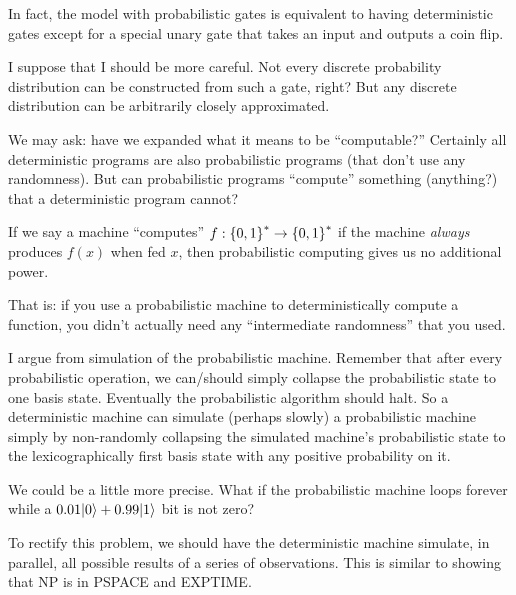 \begin{remark}
  In fact, the model with probabilistic gates is equivalent to having
  deterministic gates except for a special unary gate that takes an
  input and outputs a coin flip.

  I suppose that I should be more careful. Not every discrete
  probability distribution can be constructed from such a gate, right?
  But any discrete distribution can be arbitrarily closely approximated.
\end{remark}

\begin{remark}
  We may ask: have we expanded what it means to be ``computable?''
  Certainly all deterministic programs are also probabilistic programs
  (that don't use any randomness). But can probabilistic programs
  ``compute'' something (anything?) that a deterministic program cannot?

  If we say a machine ``computes'' $f: \left\{ 0, 1 \right\}^* \to \left\{ 0,
  1 \right\}^*$ if the machine \emph{always} produces $f(x)$ when fed $x$, then
  probabilistic computing gives us no additional power.

  That is: if you use a probabilistic machine to deterministically
  compute a function, you didn't actually need any ``intermediate
  randomness'' that you used.

  I argue from simulation of the probabilistic machine. Remember that
  after every probabilistic operation, we can/should simply collapse the
  probabilistic state to one basis state. Eventually the probabilistic
  algorithm should halt. So a deterministic machine can simulate
  (perhaps slowly) a probabilistic machine simply by non-randomly
  collapsing the simulated machine's probabilistic state to the
  lexicographically first basis state with any positive probability on
  it.
\end{remark}

\begin{remark}
  We could be a little more precise. What if the probabilistic machine
  loops forever while a $0.01 |0\rangle + 0.99 |1\rangle$ bit is not
  zero?

  To rectify this problem, we should have the deterministic machine
  simulate, in parallel, all possible results of a series of
  observations. This is similar to showing that NP is in PSPACE and
  EXPTIME.
\end{remark}

